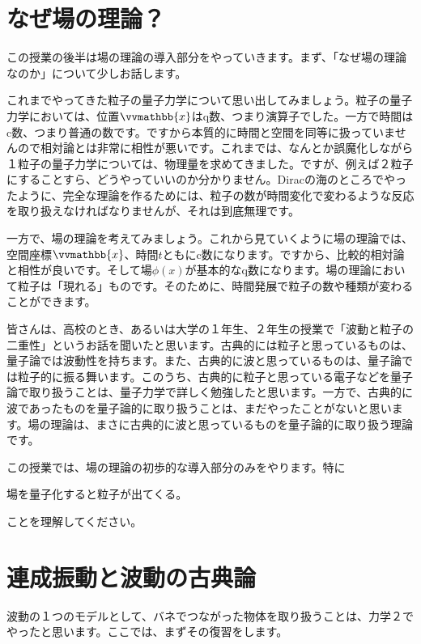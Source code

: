\documentclass[report,paper=a4, fontsize=12pt, line_length=16cm, number_of_lines=33,dvipdfmx]{jlreq}
\newenvironment{important}{\begin{tcolorbox}[
  colback = white,
  colframe = red!35,
  boxrule = 2mm,
  fonttitle = \bfseries,
  after = \noindent] }{\end{tcolorbox}}
\numberwithin{equation}{chapter}
\newcommand{\xb}{\vvmathbb{x}}
\begin{document}
\section{なぜ場の理論？}
この授業の後半は場の理論の導入部分をやっていきます。まず、「なぜ場の理論なのか」について少しお話します。

これまでやってきた粒子の量子力学について思い出してみましょう。粒子の量子力学においては、位置$\xb$はq数、つまり演算子でした。一方で時間はc数、つまり普通の数です。ですから本質的に時間と空間を同等に扱っていませんので相対論とは非常に相性が悪いです。これまでは、なんとか誤魔化しながら１粒子の量子力学については、物理量を求めてきました。ですが、例えば２粒子にすることすら、どうやっていいのか分かりません。Diracの海のところでやったように、完全な理論を作るためには、粒子の数が時間変化で変わるような反応を取り扱えなければなりませんが、それは到底無理です。

一方で、場の理論を考えてみましょう。これから見ていくように場の理論では、空間座標$\xb$、時間$t$ともにc数になります。ですから、比較的相対論と相性が良いです。そして場$\phi(x)$が基本的なq数になります。場の理論において粒子は「現れる」ものです。そのために、時間発展で粒子の数や種類が変わることができます。

皆さんは、高校のとき、あるいは大学の１年生、２年生の授業で「波動と粒子の二重性」というお話を聞いたと思います。古典的には粒子と思っているものは、量子論では波動性を持ちます。また、古典的に波と思っているものは、量子論では粒子的に振る舞います。このうち、古典的に粒子と思っている電子などを量子論で取り扱うことは、量子力学で詳しく勉強したと思います。一方で、古典的に波であったものを量子論的に取り扱うことは、まだやったことがないと思います。場の理論は、まさに古典的に波と思っているものを量子論的に取り扱う理論です。

この授業では、場の理論の初歩的な導入部分のみをやります。特に
\begin{important}
  場を量子化すると粒子が出てくる。  
\end{important}
ことを理解してください。

\section{連成振動と波動の古典論}

波動の１つのモデルとして、バネでつながった物体を取り扱うことは、力学２でやったと思います。ここでは、まずその復習をします。
\end{document}
